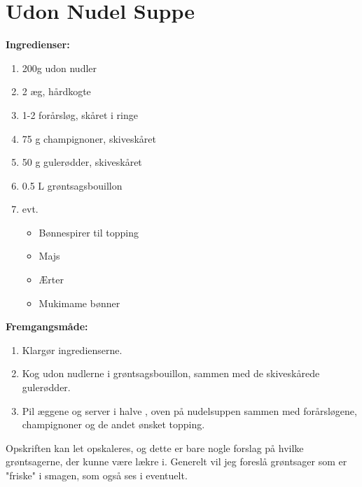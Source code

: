 \documentclass{book}
\begin{document}
\newpage \section{Udon Nudel Suppe}
\begin{minipage}[t]{0.5\textwidth}
\textbf{Ingredienser:}
\begin{enumerate}
    \item 200g udon nudler
    \item 2 æg, hårdkogte
    \item 1-2 forårsløg, skåret i ringe
    \item 75 g champignoner, skiveskåret 
    \item 50 g gulerødder, skiveskåret 
    \item 0.5 L grøntsagsbouillon 
    \item evt.
    \begin{itemize}
        \item Bønnespirer til topping
        \item Majs
        \item Ærter
        \item Mukimame bønner
    \end{itemize}
\end{enumerate}
\end{minipage}
\begin{minipage}[t]{0.5\textwidth}
\textbf{Fremgangsmåde:}
\begin{enumerate}
    \item Klargør ingredienserne.
    \item Kog udon nudlerne i grøntsagsbouillon, sammen med de skiveskårede gulerødder.
    \item Pil æggene og server i halve , oven på nudelsuppen sammen med forårsløgene, champignoner og de andet ønsket topping.  
\end{enumerate}
\end{minipage}
Opskriften kan let opskaleres, og dette er bare nogle forslag på hvilke grøntsagerne, der kunne være lækre i. Generelt vil jeg foreslå grøntsager som er "friske" i smagen, som også ses i eventuelt.
\end{document}

